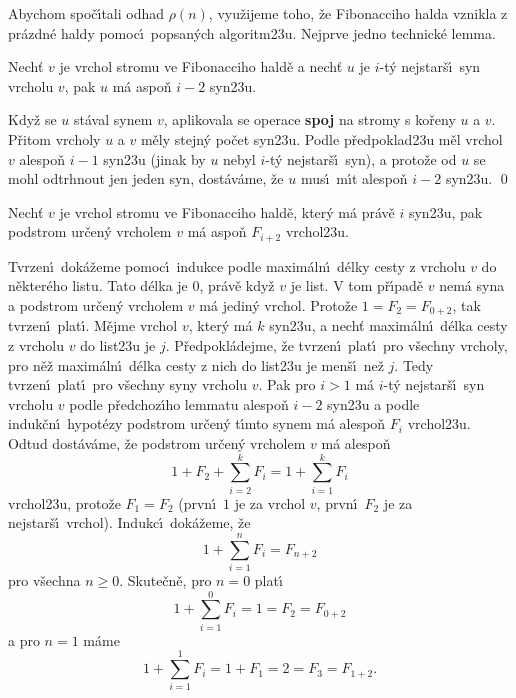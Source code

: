 \flushpar Abychom spo\v c\'\i tali odhad $\rho (n)$, vyu\v zijeme toho, \v ze 
Fibonacciho halda vznikla z pr\'azdn\'e haldy pomoc\'\i\ 
popsan\'ych algoritm\accent23u. Nejprve jedno technick\'e 
lemma.
\medskip

Nech\v t $v$ je vrchol stromu ve 
Fibonacciho hald\v e a nech\v t $u$ je $i$-t\'y nejstar\v s\'\i\ syn 
vrcholu $v$, pak $u$ m\'a aspo\v n $i-2$ syn\accent23u.
\endproclaim

Kdy\v z se $u$ st\'aval synem $v$, 
aplikovala se operace {\bf spoj} na stromy s ko\v reny $u$ a $v$. 
P\v ritom vrcholy $u$ a $v$ m\v ely stejn\'y po\v cet syn\accent23u. 
Podle p\v redpoklad\accent23u m\v el vrchol $v$ alespo\v n $i-1$ 
syn\accent23u (jinak by $u$ nebyl $i$-t\'y nejstar\v s\'\i\ syn), a 
proto\v ze od $u$ se mohl odtrhnout jen jeden syn, 
dost\'av\'ame, \v ze $u$ mus\'\i\ m\'\i t alespo\v n $i-2$ syn\accent23u. \qed
\enddemo


Nech\v t $v$ je vrchol stromu ve 
Fibonacciho hald\v e, kte\-r\'y m\'a pr\'av\v e $i$ syn\accent23u, pak 
podstrom ur\v cen\'y vrcholem $v$ m\'a aspo\v n $F_{i+2}$ 
vrchol\accent23u.
\endproclaim

Tvrzen\'\i\ dok\'a\v zeme pomoc\'\i\ indukce 
podle maxim\'aln\'\i\ d\'elky cesty z vrcholu $v$ do n\v ekter\'eho 
listu.  Tato d\'elka je $0$, pr\'av\v e kdy\v z $v$ je list.  V tom 
p\v r\'\i pad\v e $v$ nem\'a syna a podstrom ur\v cen\'y vrcholem $
v$ m\'a 
jedin\'y vrchol.  Proto\v ze $1=F_2=F_{0+2}$, tak tvrzen\'\i\ plat\'\i .  
M\v ejme vrchol $v$, kter\'y m\'a $k$ 
syn\accent23u, a nech\v t maxim\'aln\'\i\ d\'elka cesty z vrcholu $
v$ do 
list\accent23u je $j$. P\v redpokl\'adej\-me, \v ze tvrzen\'\i\ plat\'\i\ pro 
v\v sechny vrcholy, pro n\v e\v z maxim\'aln\'\i\ d\'elka cesty z nich 
do list\accent23u je men\v s\'\i\ ne\v z $j$.  Tedy tvrzen\'\i\ plat\'\i\ pro 
v\v sechny syny vrcholu $v$.  Pak pro $i>1$ m\'a $i$-t\'y nejstar\v s\'\i\ 
syn vrcholu $v$ podle p\v redchoz\'\i ho lemmatu alespo\v n $i-2$ 
syn\accent23u a podle induk\v cn\'\i\ hypot\'ezy podstrom ur\v cen\'y 
t\'\i mto synem m\'a alespo\v n $F_i$ vrchol\accent23u.  Odtud 
dost\'av\'ame, \v ze podstrom ur\v cen\'y vrcholem $v$ m\'a alespo\v n 
$$1+F_2+\sum_{i=2}^kF_i=1+\sum_{i=1}^kF_i$$
vrchol\accent23u, proto\v ze $F_1=F_2$ (prvn\'\i\ $1$ je za vrchol $
v$, 
prvn\'\i\ $F_2$ je za nejstar\v s\'\i\ vrchol). Indukc\'\i\ dok\'a\v zeme, \v ze 
$$1+\sum_{i=1}^nF_i=F_{n+2}$$
pro v\v sechna $n\ge 0$. Skute\v cn\v e, pro $n=0$ plat\'\i\ 
$$1+\sum_{i=1}^0F_i=1=F_2=F_{0+2}$$
a pro $n=1$ m\'ame 
$$1+\sum_{i=1}^1F_i=1+F_1=2=F_3=F_{1+2}.$$
\medskip

